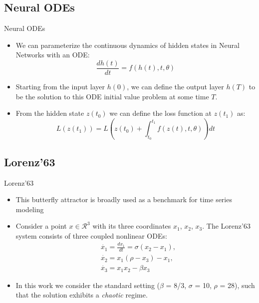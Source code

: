 \documentclass{EESD}
\begin{document}
\subsection{Neural ODEs}
\begin{frame}[t]{Neural ODEs}
\begin{itemize}
    \item We can parameterize the continuous dynamics of hidden states in Neural Networks with an ODE:\vspace{10pt}
    \begin{equation}
        \frac{dh(t)}{dt} = f(h(t), t, \theta) 
    \end{equation}\pause
    \item Starting from the input layer $h(0)$, we can define the output layer $h(T)$ to be the solution to this ODE initial value problem at some time $T$.\vspace{10pt}\pause
    \item From the hidden state $z(t_0)$ we can define the loss function at $z(t_1)$ as:
    \begin{equation}
        L(z(t_1)) = L(z(t_0)+\int_{t_0}^{t_1} f(z(t), t, \theta))dt
    \end{equation}\vspace{10pt}
\end{itemize}
\end{frame}

\subsection{Lorenz’63}
\begin{frame}[t]{Lorenz’63}
\begin{itemize}
    \item This butterfly attractor is broadly used as a benchmark for time series modeling\pause
    \item Consider a point $x\in \mathcal{R}^3$ with its three coordinates $x_1$, $x_2$, $x_3$. The Lorenz’63 system consists of three coupled nonlinear ODEs:
    \begin{equation}
    \begin{aligned}
        &\dot{x_1} = \frac{dx_1}{dt} = \sigma(x_2 - x_1), \\ 
        &\dot{x_2} = x_1(\rho - x_3) - x_1, \\
        &\dot{x_3} = x_1 x_2 - \beta x_3
    \end{aligned}
    \end{equation}
    \vspace{10pt}\pause
    \item In this work we consider the standard setting ($\beta$ = 8/3, $\sigma$ = 10, $\rho$ = 28), such that the solution exhibits a \textit{chaotic} regime. \vspace{10pt}
\end{itemize}
\end{frame}
\end{document}
